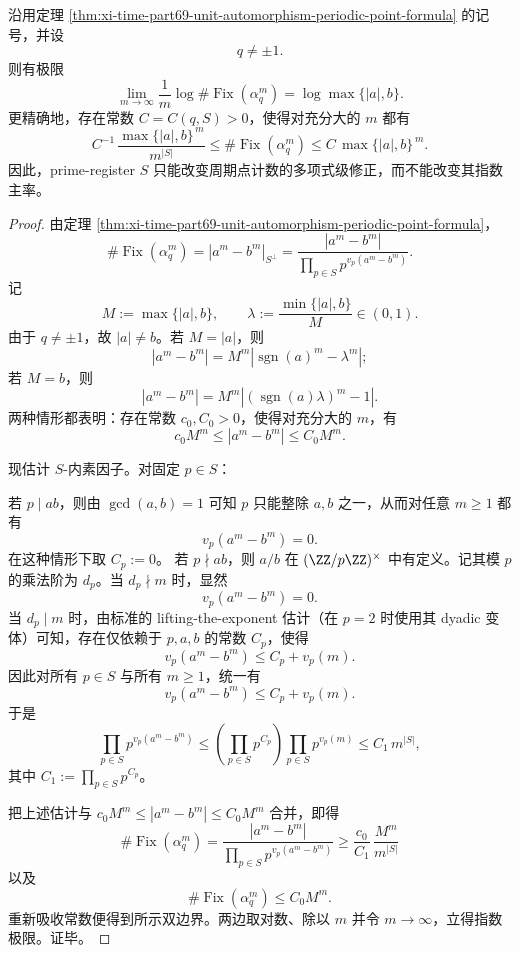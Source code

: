 \begin{theorem}\label{thm:xi-time-part69-unit-automorphism-polynomial-primeblindness}
沿用定理 \ref{thm:xi-time-part69-unit-automorphism-periodic-point-formula} 的记号，并设
\[
q\neq \pm1.
\]
则有极限
\[
\boxed{
\lim_{m\to\infty}\frac1m\log \#\operatorname{Fix}(\alpha_q^m)
=
\log\max\{|a|,b\}.
}
\]
更精确地，存在常数 \(C=C(q,S)>0\)，使得对充分大的 \(m\) 都有
\[
\boxed{
C^{-1}\,\frac{\max\{|a|,b\}^{\,m}}{m^{|S|}}
\le
\#\operatorname{Fix}(\alpha_q^m)
\le
C\,\max\{|a|,b\}^{\,m}.
}
\]
因此，prime-register \(S\) 只能改变周期点计数的多项式级修正，而不能改变其指数主率。
\end{theorem}
\begin{proof}
由定理 \ref{thm:xi-time-part69-unit-automorphism-periodic-point-formula}，
\[
\#\operatorname{Fix}(\alpha_q^m)
=
|a^m-b^m|_{S^\perp}
=
\frac{|a^m-b^m|}{\prod_{p\in S}p^{v_p(a^m-b^m)}}.
\]
记
\[
M:=\max\{|a|,b\},
\qquad
\lambda:=\frac{\min\{|a|,b\}}{M}\in(0,1).
\]
由于 \(q\neq \pm1\)，故 \(|a|\neq b\)。若 \(M=|a|\)，则
\[
|a^m-b^m|
=
M^m\left|\operatorname{sgn}(a)^m-\lambda^m\right|;
\]
若 \(M=b\)，则
\[
|a^m-b^m|
=
M^m\left|(\operatorname{sgn}(a)\lambda)^m-1\right|.
\]
两种情形都表明：存在常数 \(c_0,C_0>0\)，使得对充分大的 \(m\)，有
\[
c_0 M^m\le |a^m-b^m|\le C_0 M^m.
\]

现估计 \(S\)-内素因子。对固定 \(p\in S\)：

若 \(p\mid ab\)，则由 \(\gcd(a,b)=1\) 可知 \(p\) 只能整除 \(a,b\) 之一，从而对任意 \(m\ge 1\) 都有
\[
v_p(a^m-b^m)=0.
\]
在这种情形下取 \(C_p:=0\)。
若 \(p\nmid ab\)，则 \(a/b\) 在 \((\ZZ/p\ZZ)^\times\) 中有定义。记其模 \(p\) 的乘法阶为 \(d_p\)。当 \(d_p\nmid m\) 时，显然
\[
v_p(a^m-b^m)=0.
\]
当 \(d_p\mid m\) 时，由标准的 lifting-the-exponent 估计（在 \(p=2\) 时使用其 dyadic 变体）可知，存在仅依赖于 \(p,a,b\) 的常数 \(C_p\)，使得
\[
v_p(a^m-b^m)\le C_p+v_p(m).
\]
因此对所有 \(p\in S\) 与所有 \(m\ge1\)，统一有
\[
v_p(a^m-b^m)\le C_p+v_p(m).
\]
于是
\[
\prod_{p\in S}p^{v_p(a^m-b^m)}
\le
\left(\prod_{p\in S}p^{C_p}\right)\prod_{p\in S}p^{v_p(m)}
\le
C_1\,m^{|S|},
\]
其中 \(C_1:=\prod_{p\in S}p^{C_p}\)。

把上述估计与 \(c_0 M^m\le |a^m-b^m|\le C_0 M^m\) 合并，即得
\[
\#\operatorname{Fix}(\alpha_q^m)
=
\frac{|a^m-b^m|}{\prod_{p\in S}p^{v_p(a^m-b^m)}}
\ge
\frac{c_0}{C_1}\,\frac{M^m}{m^{|S|}}
\]
以及
\[
\#\operatorname{Fix}(\alpha_q^m)\le C_0 M^m.
\]
重新吸收常数便得到所示双边界。两边取对数、除以 \(m\) 并令 \(m\to\infty\)，立得指数极限。证毕。
\end{proof}

